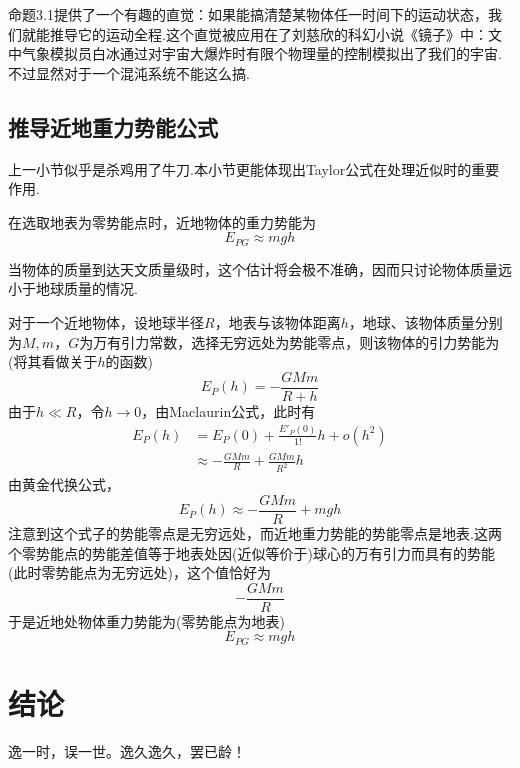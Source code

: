 命题3.1提供了一个有趣的直觉：如果能搞清楚某物体任一时间下的运动状态，我们就能推导它的运动全程.这个直觉被应用在了刘慈欣的科幻小说《镜子》\cite{liucixin}中：文中气象模拟员白冰通过对宇宙大爆炸时有限个物理量的控制模拟出了我们的宇宙.不过显然对于一个混沌系统不能这么搞.

\section{推导近地重力势能公式}

上一小节似乎是杀鸡用了牛刀.本小节更能体现出Taylor公式在处理近似时的重要作用.

\begin{proposition}
	在选取地表为零势能点时，近地物体的重力势能为$$E_{PG} \approx mgh$$
\end{proposition}
\begin{remark}
	当物体的质量到达天文质量级时，这个估计将会极不准确，因而只讨论物体质量远小于地球质量的情况.
\end{remark}

对于一个近地物体，设地球半径$R$，地表与该物体距离$h$，地球、该物体质量分别为$M,m$，$G$为万有引力常数，选择无穷远处为势能零点，则该物体的引力势能为(将其看做关于$h$的函数)$$E_P(h) = - \frac{GMm}{R+h}$$
由于$h \ll R$，令$h \to 0$，由Maclaurin公式，此时有
\begin{align*}
	E_P(h) &= E_P(0)+\frac{E'_P(0)}{1!}h + o(h^2) \\
	&\approx -\frac{GMm}{R} + \frac{GMm}{R^2} h
\end{align*}
由黄金代换公式，$$E_P(h) \approx -\frac{GMm}{R} + mgh$$
注意到这个式子的势能零点是无穷远处，而近地重力势能的势能零点是地表.这两个零势能点的势能差值等于地表处因(近似等价于)球心的万有引力而具有的势能(此时零势能点为无穷远处)，这个值恰好为$$-\frac{GMm}{R}$$
于是近地处物体重力势能为(零势能点为地表)$$E_{PG} \approx mgh$$







\chapter*{结\quad 论}

逸一时，误一世。逸久逸久，罢已龄！
